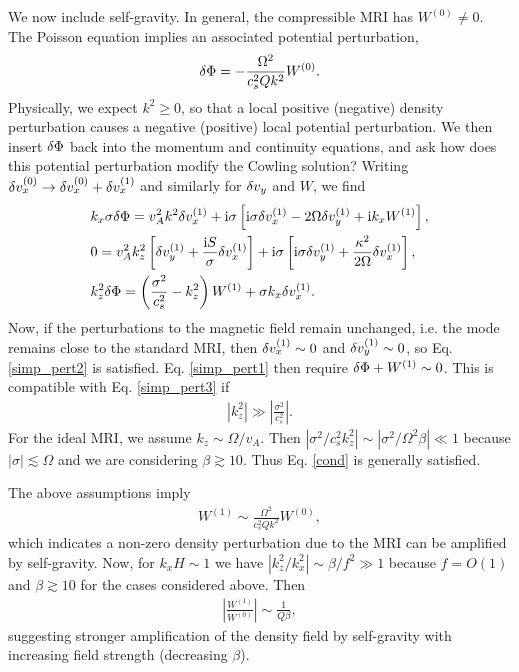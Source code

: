 We now include self-gravity. In general, the compressible MRI has
$W^{(0)}\neq0$. The Poisson equation implies
an associated potential perturbation,    
\begin{align} 
  \delta \Phi = -\frac{\Omega^2}{c_s^2 Q k^2} W^{(0)}.
\end{align}
Physically, we expect $k^2\geq0$, so that a local positive (negative) density
perturbation causes a negative (positive) local potential
perturbation. We then insert $\delta \Phi$ back into the momentum and
continuity equations, and ask how does this potential perturbation
modify the Cowling solution? Writing $\delta v_x^{(0)} \to \delta v_x^{(0)} +
\delta v_x^{(1)}$ and similarly for $\delta v_y $ and $ W$, we find 
\begin{align}
  &   k_x\sigma \delta \Phi = v_A^2k^2\delta v_x^{(1)} + \mathrm{i}\sigma\left[\mathrm{i}\sigma
  \delta v_x^{(1)} - 2\Omega\delta v_y^{(1)} + \mathrm{i} k_x W^{(1)}\right], \label{simp_pert1}\\ 
  &  0= v_A^2k_z^2\left[\delta v_y^{(1)} + \frac{\mathrm{i} S
    }{\sigma}\delta v_x^{(1)}\right] + \mathrm{i}\sigma\left[\mathrm{i}\sigma\delta v_y^{(1)} +
  \frac{\kappa^2}{2\Omega}\delta v_x^{(1)}\right],\label{simp_pert2}\\
  & k_z^2\delta \Phi  = \left(\frac{\sigma^2}{c_s^2}-k_z^2\right)W^{(1)} +
  \sigma k_x \delta v_x^{(1)}.\label{simp_pert3} 
\end{align}
Now, if the perturbations to the magnetic field remain
unchanged, i.e. the mode remains close to the standard MRI, then
$\delta v_x^{(1)} \sim 0$ and $\delta v_y^{(1)}\sim0$, so Eq. \ref{simp_pert2} is
satisfied. Eq. \ref{simp_pert1} then require $\delta \Phi +
W^{(1)}\sim0$. This is compatible with Eq. \ref{simp_pert3} if 
\begin{align}
  \left|k_z^2\right| \gg \left|\frac{\sigma^2}{c_s^2}\right|. \label{cond}
\end{align}
For the ideal MRI,  we assume $k_z\sim \Omega/v_A$. Then
$|\sigma^2/c_s^2k_z^2|\sim |\sigma^2/\Omega^2\beta|\ll1$ because
$|\sigma|\lesssim \Omega$ and we are considering $\beta\gtrsim 10$. 
Thus Eq. \ref{cond} is generally satisfied.   

The above assumptions imply
\begin{align}
  W^{(1)} \sim \frac{\Omega^2}{c_s^2 Q k^2} W^{(0)},\label{feedback}
\end{align} 
which indicates a non-zero density perturbation due to the
MRI can be amplified by self-gravity. Now, for $k_xH\sim 1$ we have
$|k_z^2/k_x^2|\sim \beta/f^2\gg1$ because $f=O(1)$ and $\beta\gtrsim10$
for the cases considered above. Then
\begin{align}
  \left|\frac{W^{(1)}}{W^{(0)}}\right| \sim \frac{1}{Q\beta}, 
\end{align}
 suggesting stronger amplification of the density field by 
 self-gravity with increasing field strength (decreasing
 $\beta$). 

